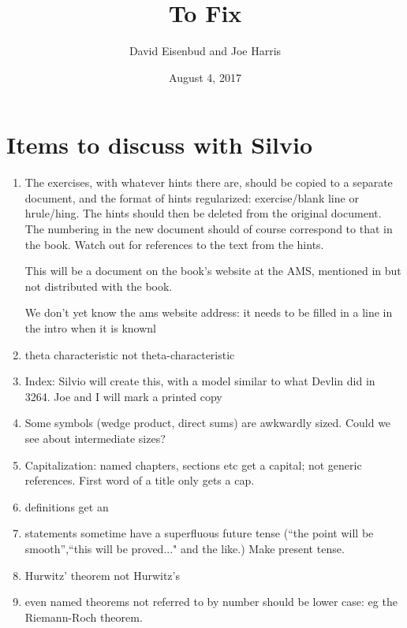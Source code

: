 \documentclass[12pt, leqno]{book}
\date{August 4, 2017}
\title{To Fix}
\author{David Eisenbud and Joe Harris }
\begin{document}
\maketitle

\setlength{\parskip}{5pt}

 
 \section{Items to discuss with Silvio}
 
 \begin{enumerate}
 
 \item The exercises, with whatever hints there are, should be copied to a separate document, and the format of hints regularized: 
 exercise/blank line or hrule/hing. The hints should then be deleted from the original document. The numbering in the new document should of course correspond to that in the book. Watch out for references to the text from the hints.
 
 This will be a document on the book's website at the AMS, 
 mentioned in but not distributed with the book.
 
 We don't yet know the ams website address: it needs to be filled in a line in the intro when it is knownl
   
\item theta characteristic not theta-characteristic 

 \item Index: Silvio will create this, with a model similar to what Devlin did in 3264. Joe and I will mark a printed copy
 
 \item Some symbols (wedge product, direct sums) are awkwardly sized. Could we see about intermediate sizes?
 
 \item Capitalization: named chapters, sections etc get a capital; not generic references. First word of a title only gets a cap.
 
 \item definitions get an \emph{}
 
 \item statements sometime have a superfluous future tense (``the point will be smooth'',``this will be proved..." and the like.) Make present tense.
 
 \item Hurwitz' theorem not Hurwitz's 
 
 \item even named theorems not referred to by number should be lower case: eg the Riemann-Roch theorem. 
 


\end{enumerate}
\end{document}
